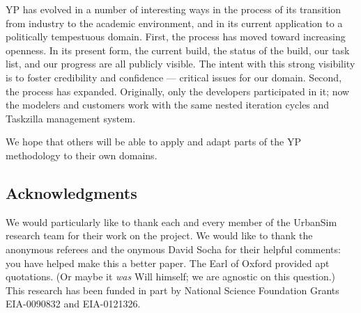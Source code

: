 \documentclass[times, 10pt,twocolumn]{article}
\begin{document}
YP has evolved in a number of interesting ways in the process of its
transition from industry to the academic environment, and in its current
application to a politically tempestuous domain.  First, the process has moved
toward increasing openness.  In its present form, the current build, the
status of the build, our task list, and our progress are all publicly
visible.  The intent with this strong visibility is to foster credibility
and confidence --- critical issues for our domain.  Second, the process has
expanded.  Originally, only the developers participated in it; now the
modelers and customers work with the same nested iteration cycles and
Taskzilla management system.  

We hope that others will be able to apply and adapt parts of the YP
methodology to their own domains.

\subsection*{Acknowledgments}

We would particularly like to thank each and every member of the UrbanSim
research team for their work on the project.  We would like to thank the 
anonymous referees and the onymous David Socha for their helpful comments:
you have helped make this a better paper.  The Earl of Oxford provided
apt quotations.  (Or maybe it \emph{was} Will himself; we are agnostic on
this question.)  This research has been funded in part by National Science
Foundation Grants EIA-0090832 and EIA-0121326.



\end{document}

